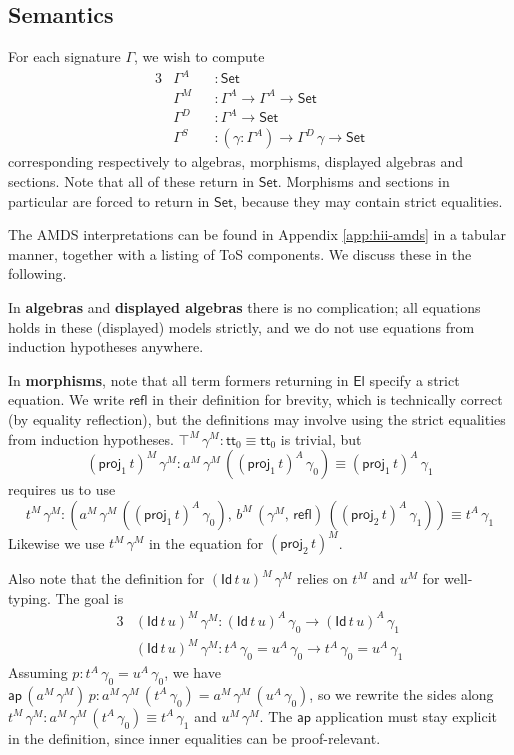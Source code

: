 \documentclass[12pt,a4paper,twoside,openany]{book}
\theoremstyle{remark}
\theoremstyle{definition}
\theoremstyle{theorem}
\newcommand{\ms}[1]{\mathsf{#1}}
\newcommand{\ap}{\ms{ap}}
\newcommand{\refl}{\mathsf{refl}}
\newcommand{\El}{\mathsf{El}}
\newcommand{\Id}{\mathsf{Id}}
\newcommand{\proj}{\mathsf{proj}}
\renewcommand{\tt}{\mathsf{tt}}
\newcommand{\Set}{\mathsf{Set}}
\begin{document}
\subsection{Semantics}

For each signature $\Gamma$, we wish to compute
\begin{alignat*}{3}
  &\Gamma^A &&: \Set\\
  &\Gamma^M &&: \Gamma^A \to \Gamma^A \to \Set\\
  &\Gamma^D &&: \Gamma^A \to \Set\\
  &\Gamma^S &&: (\gamma : \Gamma^A) \to \Gamma^D\,\gamma \to \Set
\end{alignat*}
corresponding respectively to algebras, morphisms, displayed algebras and
sections. Note that all of these return in $\Set$. Morphisms and sections in
particular are forced to return in $\Set$, because they may contain strict
equalities.

The AMDS interpretations can be found in Appendix \ref{app:hii-amds} in a
tabular manner, together with a listing of ToS components. We discuss these
in the following.

In \textbf{algebras} and \textbf{displayed algebras} there is no
complication; all equations holds in these (displayed) models strictly, and we
do not use equations from induction hypotheses anywhere.

In \textbf{morphisms}, note that all term formers returning in $\El$ specify a
strict equation. We write $\refl$ in their definition for brevity, which is
technically correct (by equality reflection), but the definitions may involve
using the strict equalities from induction hypotheses.  $\top^M\,\gamma^M :
\tt_0 \equiv \tt_0$ is trivial, but
\[  (\proj_1\,t)^M\,\gamma^M : a^M\,\gamma^M\,((\proj_1\,t)^A\,\gamma_0) \equiv (\proj_1\,t)^A\,\gamma_1\]
requires us to use
\[t^M\,\gamma^M : (a^M\,\gamma^M\,((\proj_1\,t)^A\,\gamma_0),\,b^M\,(\gamma^M,\,\refl)\,((\proj_2\,t)^A\,\gamma_1))
\equiv t^A\,\gamma_1 \]
Likewise we use $t^M\,\gamma^M$ in the equation for $(\proj_2\,t)^M$.

Also note that the definition for $(\Id\,t\,u)^M\,\gamma^M$ relies on $t^M$ and
$u^M$ for well-typing. The goal is
\begin{alignat*}{3}
  &(\Id\,t\,u)^M\,\gamma^M : (\Id\,t\,u)^A\,\gamma_0 \to (\Id\,t\,u)^A\,\gamma_1\\
  &(\Id\,t\,u)^M\,\gamma^M : t^A\,\gamma_0 = u^A\,\gamma_0 \to t^A\,\gamma_0 = u^A\,\gamma_1
\end{alignat*}
Assuming $p : t^A\,\gamma_0 = u^A\,\gamma_0$, we have $\ap\,(a^M\,\gamma^M)\,p :
a^M\,\gamma^M\,(t^A\,\gamma_0) = a^M\,\gamma^M\,(u^A\,\gamma_0)$, so we rewrite
the sides along $t^M\,\gamma^M : a^M\,\gamma^M\,(t^A\,\gamma_0) \equiv
t^A\,\gamma_1$ and $u^M\,\gamma^M$. The $\ap$ application must stay explicit in
the definition, since inner equalities can be proof-relevant.
\end{document}
